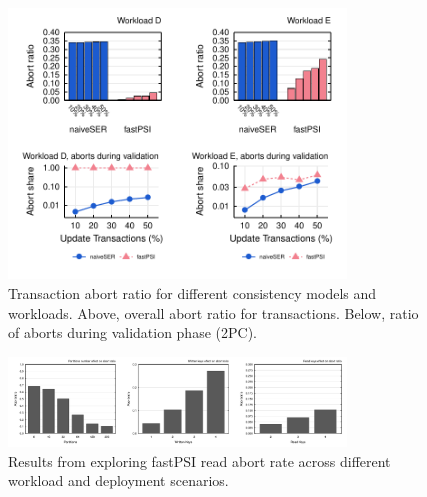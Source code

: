 \begin{figure}[t]
\begin{center}
\includegraphics[width=0.8\textwidth]{figures/abort_rate_bench.pdf}
\vspace{-0.5cm}
\end{center}
\caption{Transaction abort ratio for different consistency models and workloads. Above, overall abort ratio for transactions. Below, ratio of aborts during validation phase (2PC).}
\label{fig:raw_abort_rate}
\end{figure}

\begin{figure}[t]
\begin{center}
\includegraphics[width=0.8\textwidth]{figures/psi_read_abort_bench.pdf}
\vspace{-0.5cm}
\end{center}
\caption{Results from exploring fastPSI read abort rate across different workload and deployment scenarios.}
\label{fig:fastpsi_abort_rate}
\end{figure}
